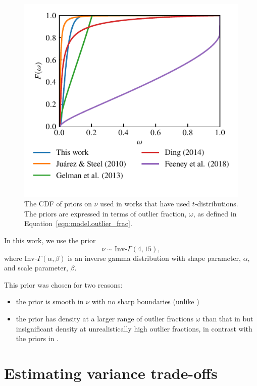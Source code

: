 \documentclass[fleqn,usenatbib]{rasti}
\begin{document}
\begin{figure}
	\includegraphics[width=\columnwidth]{graphics/cdf_outlier_frac}
    \caption{The CDF of priors on $\nu$ used in works that have used
    $t$-distributions. The priors are expressed in terms of outlier fraction,
    $\omega$, as defined in Equation~\ref{eqn:model.outlier_frac}.}
    \label{fig:priors.outlier_frac}
\end{figure}

In this work, we use the prior
\begin{equation}
    \nu \sim \text{Inv-}\Gamma(4, 15),
\end{equation}
where $\text{Inv-}\Gamma(\alpha, \beta)$ is an inverse gamma distribution with
shape parameter, $\alpha$, and scale parameter, $\beta$.

This prior was chosen for two reasons:
\begin{itemize}
    \item the prior is smooth in $\nu$ with no sharp boundaries (unlike
          \citet{Gelman:2013})
    \item the prior has density at a larger range of outlier fractions $\omega$
          than that in \citet{Juarez:2010} but insignificant density
          at unrealistically high outlier fractions, in contrast with the priors
          in \citet{Ding:2014, Feeney:2018}.
\end{itemize}

\section{Estimating variance trade-offs}
\label{sec:fisher}
\end{document}
